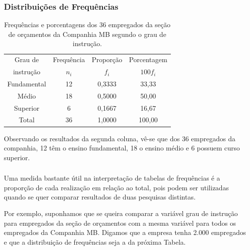 \documentclass[12pt]{beamer}
\begin{document}
\begin{frame}{}
\frametitle{Distribuições de Frequências}
\vspace{-0.5cm}
\begin{block}{}
\justifying
\begin{table}[H]
\caption{Frequências e porcentagens dos 36 empregados da seção de orçamentos da Companhia MB segundo o grau de instrução.}
\label{tab2}
\begin{tabular}{c|c|c|c}
\hline
Grau de   &Frequência&Proporção&Porcentagem\\
instrução &$n_{i}$   &$f_{i}$  &$100f_{i}$ \\
\hline
Fundamental&12       &0,3333   &33,33      \\
Médio      &18       &0,5000   &50,00      \\
Superior   & 6       &0,1667   &16,67      \\
\hline
Total      &36       &1,0000   &100,00     \\
\hline
\end{tabular}
\end{table}
\end{block}
\pause
\vspace{-0.3cm}
\begin{block}{}
\justifying
Observando os resultados da segunda coluna, vê-se que dos 36 empregados da companhia,
12 têm o ensino fundamental, 18 o ensino médio e 6 possuem curso superior.
\end{block}
\end{frame}

\begin{frame}{}
\frametitle{}
\begin{block}{}
\justifying
Uma medida bastante útil na interpretação de tabelas de frequências é a proporção de
cada realização em relação ao total, pois podem ser utilizadas quando se quer comparar
resultados de duas pesquisas distintas.
\end{block}
\pause
\begin{block}{}
\justifying
Por exemplo, suponhamos que se queira comparar a variável grau de instrução para empregados da seção de orçamentos com a mesma variável para todos os empregados da Companhia MB. Digamos que a empresa tenha 2.000 empregados e que a distribuição de frequências seja a da próxima Tabela.
\end{block}
\end{frame}
\end{document}
